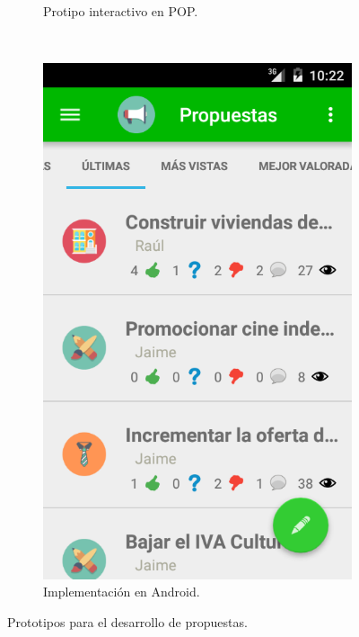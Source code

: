 \begin{enumerate}
\begin{figure}[H]
\begin{subfigure}[b]{0.3\textwidth}
                \caption{Protipo interactivo en POP.}
                \label{fig:quipText}
        \end{subfigure}
        ~
        \begin{subfigure}[b]{0.3\textwidth}
                \includegraphics[width=\textwidth]{Media/Captures/prot2_3.png}
                \caption{Implementación en Android.}
                \label{fig:quipComments}
        \end{subfigure}
        \caption{Prototipos para el desarrollo de propuestas.}\label{fig:protProposals}
	\end{figure}


\end{enumerate}
